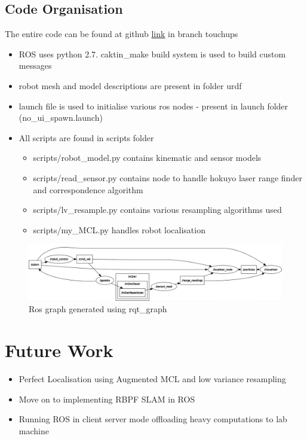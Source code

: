 \documentclass{article}
\begin{document}
\subsection{Code Organisation}
    The entire code can be found at github \href{https://github.com/aswinpajayan/localisation-mcl/tree/touchups}{link} in branch touchups
     \begin{itemize}
         \item ROS uses python 2.7. caktin\_make build system is used to build custom messages
         \item robot mesh and model descriptions are present in folder urdf
         \item launch file is used to initialise various ros nodes - present in launch folder (no\_ui\_spawn.launch)
         \item All scripts are found in scripts folder

            \begin{itemize}
                \item scripts/robot\_model.py contains kinematic and sensor models
                    \item scripts/read\_sensor.py contains node to handle hokuyo laser range finder and correspondence algorithm 
                    \item scripts/lv\_resample.py contains various resampling algorithms used
                    \item scripts/my\_MCL.py handles robot localisation
            \end{itemize}
     \end{itemize}
\begin{figure}
        \includegraphics[width = 120mm]{./rosgraph.png}
        \caption{Ros graph generated using rqt\_graph}
    \end{figure}



\section{Future Work}
\begin{itemize}
    \item Perfect Localisation using Augmented MCL and low variance resampling
    \item Move on to implementing RBPF SLAM in ROS 
    \item Running ROS in client server mode offloading heavy computations to lab machine 
\end{itemize}
\end{document}
